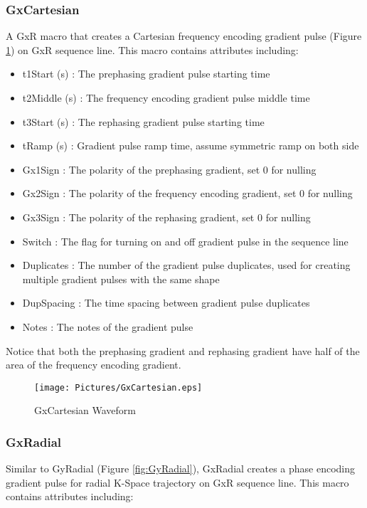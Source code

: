 \documentclass{book}%
\begin{document}
\subsubsection{GxCartesian}

A GxR macro that creates a Cartesian frequency encoding gradient pulse (Figure \ref{fig:GxCartesian}) on GxR sequence line. This macro contains attributes including:

\begin{itemize}
	\item t1Start (s) : The prephasing gradient pulse starting time
	\item t2Middle (s) : The frequency encoding gradient pulse middle time
	\item t3Start (s) : The rephasing gradient pulse starting time
	\item tRamp (s) : Gradient pulse ramp time, assume symmetric ramp on both side
	\item Gx1Sign : The polarity of the prephasing gradient, set 0 for nulling
	\item Gx2Sign : The polarity of the frequency encoding gradient, set 0 for nulling
	\item Gx3Sign : The polarity of the rephasing gradient, set 0 for nulling
	\item Switch : The flag for turning on and off gradient pulse in the sequence line
	\item Duplicates : The number of the gradient pulse duplicates, used for creating multiple gradient pulses with the same shape
	\item DupSpacing : The time spacing between gradient pulse duplicates
	\item Notes : The notes of the gradient pulse 
\end{itemize}

Notice that both the prephasing gradient and rephasing gradient have half of the area of the frequency encoding gradient.

\begin{figure}[htbp]
	\centering
		\texttt{[image: Pictures/GxCartesian.eps]}
	\caption{GxCartesian Waveform}
	\label{fig:GxCartesian}
\end{figure}		

\subsubsection{GxRadial}

Similar to GyRadial (Figure \ref{fig:GyRadial}), GxRadial creates a phase encoding gradient pulse for radial K-Space trajectory on GxR sequence line. This macro contains attributes including:
\end{document}
